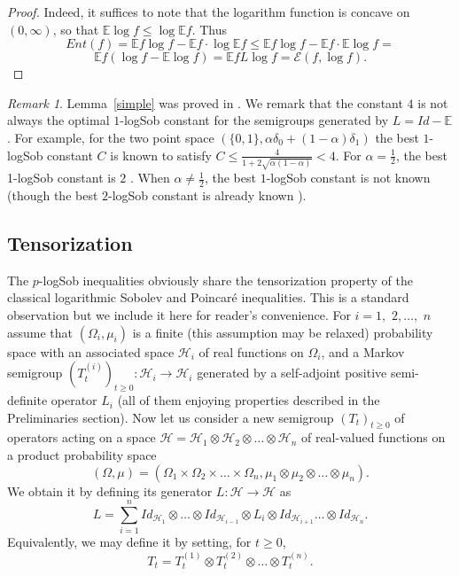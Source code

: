 \documentclass[11pt]{amsart}
\newcommand{\E}{\mathbb{E}}
\newcommand{\1}{\mathbf{1}}
\def\e{{\mathcal{E}}}
\def\E{{\mathbb E}}
\def\H{{\mathcal{H}}}
\theoremstyle{definition}
\theoremstyle{plain}
\theoremstyle{remark}
\newtheorem{remark}[example]{Remark}
\numberwithin{equation}{section}
\begin{document}
\begin{proof}
Indeed, it suffices to note that the logarithm function is concave on
$(0,\infty)$, so that $\E \log f \leq \log \E f$. Thus
\[
Ent(f)=\E f\log f - \E f \cdot \log \E f \leq
\E f\log f- \E f \cdot \E \log f=
\]
\[
\E f(\log f-\E \log f) =
\E fL\log f= \e(f,\log f).
\]
\end{proof}

\begin{remark}
Lemma~\ref{simple} was proved in \cite{BobkovTetali06}. We remark that  the constant $4$ is not always the optimal $1$-logSob constant for the semigroups generated  by $L=Id-\E$. For example,  for the  two point space $(\{ 0, 1\}, \alpha\delta_0+ (1-\alpha)\delta_1)$ the best $1$-logSob constant $C$ is known \cite{BobkovTetali06} to satisfy $C \le \frac{4}{1+ 2\sqrt{\alpha(1 - \alpha)}} <4$.  For  $\alpha = \frac 12$, the best 1-logSob constant is $2$ \cite{BobkovTetali06}. When $\alpha \ne \frac 12$, the best $1$-logSob constant  is not known (though the best $2$-logSob constant is already known \cite{DiaconisSaloff-Coste:96}). 
\end{remark}

\subsection{Tensorization} \label{sec:logSobTensorization}
 The $p$-logSob inequalities obviously share the tensorization property of the classical
logarithmic Sobolev and Poincar\'e inequalities. This is a standard observation but we include it here for reader's convenience.
For $i=1,$ $2,\ldots,$ $n$ assume that $(\Omega_{i}, \mu_{i})$ is a finite (this assumption may be relaxed)
probability space with an associated space $\H_{i}$ of real functions on $\Omega_{i}$,
and a Markov semigroup $(T^{(i)}_{t})_{t \geq 0}:\H_{i} \rightarrow \H_{i}$ generated by a self-adjoint positive
semi-definite operator $L_{i}$ (all of them enjoying properties described in the Preliminaries section).
Now let us consider a new semigroup $(T_{t})_{t \geq 0}$ of operators acting on a space $\H=\H_{1} \otimes \H_{2}
\otimes \ldots \otimes \H_{n}$
of real-valued functions on a product probability space
\[
(\Omega, \mu)=(\Omega_{1} \times \Omega_{2} \times \ldots \times \Omega_{n}, \mu_{1} \otimes \mu_{2} \otimes \ldots \otimes \mu_{n}).
\]
We obtain it by defining its generator $L:\H \rightarrow \H$ as
\[
L= \sum_{i=1}^{n}  Id_{\H_{1}} \otimes \ldots \otimes
Id_{\H_{i-1}} \otimes L_{i} \otimes Id_{\H_{i+1}} \ldots
\otimes Id_{\H_{n}}.
\]
Equivalently, we may define it by setting, for $t \geq 0$,
\[
T_{t}= T^{(1)}_{t} \otimes
T^{(2)}_{t} \otimes \ldots \otimes T^{(n)}_{t}.
\]
\end{document}
